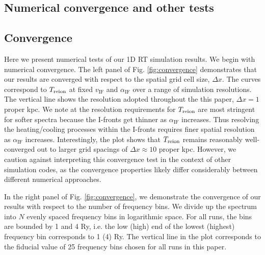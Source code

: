 \documentclass[twocolumn]{aastex62}
\newcommand{\Treion}{T_{\rm reion}}
\newcommand{\vIF}{v_{\mathrm{IF}}}
\newcommand{\spec}{\alpha_{\mathrm{IF}}}
\begin{document}




\begin{appendix}


\section{Numerical convergence and other tests}
\label{sec:convergence}

\subsection{Convergence}

Here we present numerical tests of our 1D RT simulation results.  We begin with numerical convergence.  The left panel of Fig. \ref{fig:convergence} demonstrates that our results are converged with respect to the spatial grid cell size, $\Delta x$.  The curves correspond to $\Treion$ at fixed $\vIF$ and $\spec$ over a range of simulation resolutions.  The vertical line shows the resolution adopted throughout the this paper, $\Delta x = 1$ proper kpc.  We note at the resolution requirements for $\Treion$ are most stringent for softer spectra because the I-fronts get thinner as $\spec$ increases.  Thus resolving the heating/cooling processes within the I-fronts requires finer spatial resolution as $\spec$ increases. Interestingly, the plot shows that $\Treion$ remains reasonably well-converged out to larger grid spacings of $\Delta x \approx 10$ proper kpc.  However, we caution against interpreting this convergence test in the context of other simulation codes, as the convergence properties likely differ considerably between different numerical approaches.   

In the right panel of Fig. \ref{fig:convergence}, we demonstrate the convergence of our results with respect to the number of frequency bins.  We divide up the spectrum into $N$ evenly spaced frequency bins in logarithmic space.  For all runs, the bins are bounded by 1 and 4 Ry, i.e. the low (high) end of the lowest (highest) frequency bin corresponds to 1 (4) Ry.  The vertical line in the plot corresponds to the fiducial value of 25 frequency bins chosen for all runs in this paper.     


\end{appendix}
\end{document}
